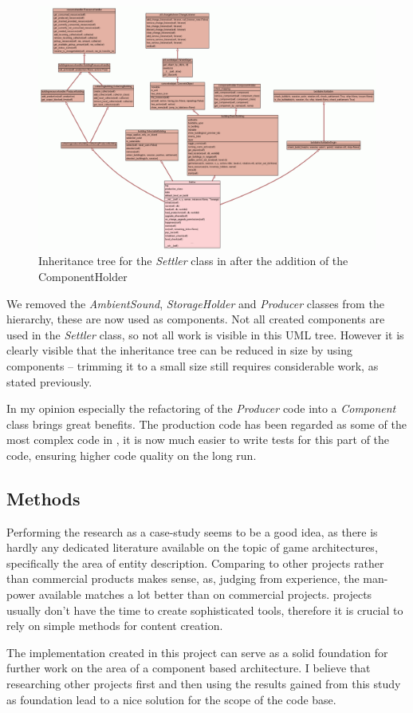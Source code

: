 \begin{figure}[!htb]
\includegraphics[angle=90,scale=0.35]{pics/settler_umlv}
\caption{Inheritance tree for the \textit{Settler} class in \UH{} after the addition of the ComponentHolder}
\label{fig:settleruml2}
\end{figure}

We removed the \textit{AmbientSound}, \textit{StorageHolder} and \textit{Producer} classes from the hierarchy, these are now used as components.
Not all created components are used in the \textit{Settler} class, so not all work is visible in this UML tree. However
it is clearly visible that the inheritance tree can be reduced in size by using components -- trimming it to a
small size still requires considerable work, as stated previously.

In my opinion especially the refactoring of the \textit{Producer} code into a \textit{Component} class brings great
benefits. The production code has been regarded as some of the most complex code in \UH{}, it is now much easier to
write tests for this part of the code, ensuring higher code quality on the long run.

\subsection{Methods}
Performing the research as a case-study seems to be a good idea, as there is hardly any dedicated literature available on
the topic of game architectures, specifically the area of entity description. Comparing \UH{} to other \OS{} projects
rather than commercial products makes sense, as, judging from experience, the man-power available matches a lot better than on commercial
projects. \OS{} projects usually don't have the time to create sophisticated tools, therefore it is crucial to rely on
simple methods for content creation.

The implementation created in this project can serve as a solid foundation for further work on the area of a component
based architecture. I believe that researching other projects first and then using the results gained from this study as
foundation lead to a nice solution for the scope of the \UH{} code base.
